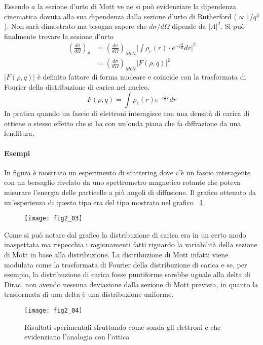 Essendo $a$ la sezione d'urto di Mott ve ne si può evidenziare la dipendenza cinematica dovuta alla sua dipendenza dalla sezione d'urto di Rutherford ($\propto 1/q^4$). 
Non sarà dimostrato ma bisogna sapere che $d\sigma/d\Omega$ dipende da $|A|^2$.
Si può finalmente trovare la sezione d'urto
\begin{equation}
\begin{split}
\left(\frac{d\sigma}{d\Omega}\right)_\theta &=\left(\frac{d\sigma}{d\Omega}\right)_{Mott}\biggl| \int\rho_e(r)\cdot e^{-i\frac{q}{\hbar}}dr\biggl|^2\\
&=\left(\frac{d\sigma}{d\Omega}\right)_{Mott}|F(\rho,q)|^2
\end{split}
\end{equation}
$|F(\rho,q)|$ è definito fattore di forma nucleare e coincide con la trasformata di Fourier della distribuzione di carica nel nucleo.
\begin{equation}
F(\rho, q)=\int \rho_e(r)e^{-i\frac{q}{\hbar}r}dr
\end{equation}
In pratica quando un fascio di elettroni interagisce con una densità di carica di ottiene o stesso effetto che si ha con un'onda piana che fa diffrazione da una fenditura.

\paragraph{Esempi}
In figura è mostrato un esperimento di scattering dove c'è un fascio interagente con un bersaglio rivelato da uno spettrometro magnetico rotante che poteva misurare l'energia delle particelle a più angoli di diffusione. Il grafico ottenuto da un'esperienza di questo tipo era del tipo mostrato nel grafico ~\ref{N:01}.
\begin{figure}[h]
\centering
\texttt{[image: fig2\_03]}
\end{figure}

Come si può notare dal grafico la distribuzione di carica era in un certo modo inaspettata ma rispecchia i ragionamenti fatti riguardo la variabilità della sezione di Mott in base alla distribuzione.
La distribuzione di Mott infatti viene modulata come la trasformata di Fourier della distribuzione di carica e se, per esempio, la distribuzione di carica fosse puntiforme sarebbe uguale alla delta di Dirac, non avendo nessuna deviazione dalla sezione di Mott prevista, in quanto la trasformata di una delta è una distribuzione uniforme. 
\begin{figure}[h]
\centering
\texttt{[image: fig2\_04]}
\caption{Risultati sperimentali sfruttando come sonda gli elettroni e che evidenziano l'analogia con l'ottica}
\label{N:01}
\end{figure}

